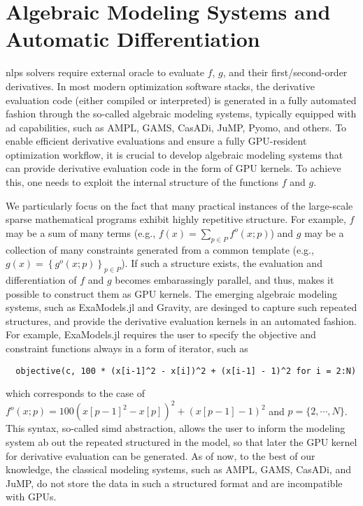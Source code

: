 \documentclass{article}
\begin{document}
\section{Algebraic Modeling Systems and Automatic Differentiation}\label{eqn:ad}
\Glspl*{nlp} solvers require external oracle to  evaluate $f$, $g$, and their first/second-order derivatives. In most modern optimization software stacks, the derivative evaluation code (either compiled or interpreted) is generated in a fully automated fashion through the so-called algebraic modeling systems, typically equipped with \gls*{ad} capabilities, such as AMPL, GAMS, CasADi, JuMP, Pyomo, and others. To enable efficient derivative evaluations and ensure a fully GPU-resident optimization workflow, it is crucial to develop algebraic modeling systems that can provide derivative evaluation code in the form of GPU kernels. To achieve this, one needs to exploit the internal structure of the functions $f$ and $g$.

We particularly focus on the fact that many practical instances of the large-scale sparse mathematical programs exhibit highly repetitive structure. For example, $f$ may be a sum of many terms (e.g., $f(x) = \sum_{p\in P} f^o(x; p)$) and $g$ may be a collection of many constraints generated from a common template (e.g., $g(x) = \left\{g^o(x; p)\right\}_{p\in P}$).
If such a structure exists, the evaluation and differentiation of $f$ and $g$ becomes embarassingly parallel, and thus, makes it possible to construct them as GPU kernels.
The emerging algebraic modeling systems, such as ExaModels.jl and Gravity, are desinged to capture such repeated structures, and provide the derivative evaluation kernels in an automated fashion. For example, ExaModels.jl requires the user to specify the objective and constraint functions always in a form of iterator, such as
\begin{lstlisting}
  objective(c, 100 * (x[i-1]^2 - x[i])^2 + (x[i-1] - 1)^2 for i = 2:N)
\end{lstlisting}
which corresponds to the case of $f^o(x; p) = 100(x[p-1]^2 - x[p])^2 + (x[p-1]-1)^2$ and $p=\{2,\cdots,N\}$.
This syntax, so-called \gls*{simd} abstraction, allows the user to inform the modeling system ab out the repeated structured in the model, so that later the GPU kernel for derivative evaluation can be generated.
As of now, to the best of our knowledge, the classical modeling systems, such as AMPL, GAMS, CasADi, and JuMP, do not store the data in such a structured format and are incompatible with GPUs.
\end{document}
